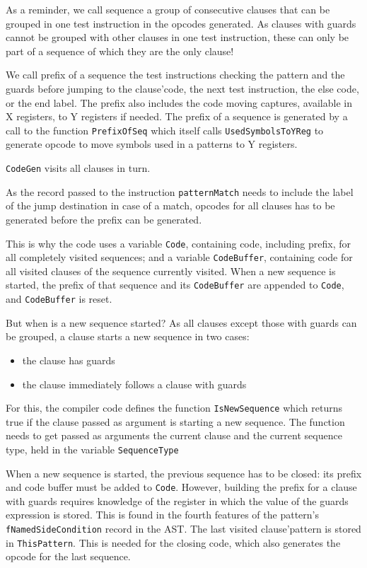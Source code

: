 \documentclass[a4paper]{memoir}
\begin{document}
As a reminder, we call sequence a group of consecutive clauses that can be
grouped in one test instruction in the opcodes generated. As clauses with guards
cannot be grouped with other clauses in one test instruction, these
can only be part of a sequence of which they are the only clause!

We call prefix of a sequence the test
instructions checking the pattern and the guards before jumping to the
clause'code, the next test instruction, the else code, or the end label.
The prefix also includes the code moving captures, available in X registers,
to Y registers if needed.
The prefix of a sequence is generated by a call to the function
\lstinline!PrefixOfSeq! which itself calls \lstinline!UsedSymbolsToYReg! to
generate opcode to move symbols used in a patterns to Y registers.

\lstinline!CodeGen! visits all clauses in turn.

As the record passed to the instruction \lstinline!patternMatch! needs to
include the label of the jump destination in case of a match, opcodes for all
clauses has to be generated before the prefix can be generated.

This is why the code uses a variable \lstinline!Code!, containing code,
including prefix, for all completely visited sequences; and a variable
\lstinline!CodeBuffer!, containing code for all visited clauses of the sequence
currently visited. When a new sequence is started, the prefix of that sequence
and its \lstinline!CodeBuffer! are appended to \lstinline!Code!, and
\lstinline!CodeBuffer! is reset.

But when is a new sequence started? As all clauses except those with guards can
be grouped, a clause starts a new sequence in two cases:
\begin{itemize}
  \item the clause has guards
  \item the clause immediately follows a clause with guards
\end{itemize}

For this, the compiler code defines the function
\lstinline!IsNewSequence! which returns true if the clause passed as argument
is starting a new sequence. The function needs to get passed as arguments the current clause and
the current sequence type, held in the variable \lstinline!SequenceType!

When a new sequence is started, the previous sequence has to be closed: its
prefix and code buffer must be added to \lstinline!Code!. However, building the
prefix for a clause with guards requires knowledge of the register in which the
value of the guards expression is stored. This is found in the fourth features
of the pattern's \lstinline!fNamedSideCondition! record in the AST.
The last visited clause'pattern is stored in \lstinline!ThisPattern!. This is
needed for the closing code, which also generates the opcode for the last sequence.
\end{document}
